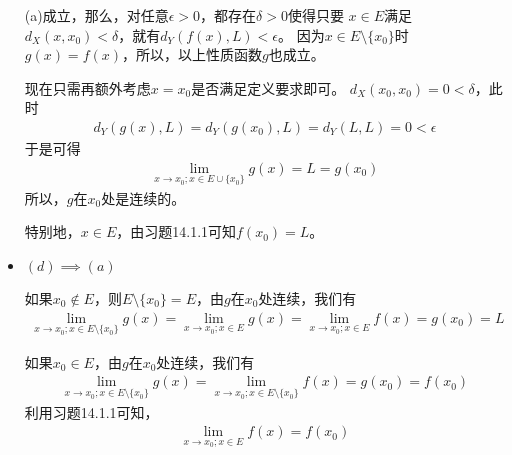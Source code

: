 \documentclass{article}
\begin{document}
\begin{itemize}
        (a)成立，那么，对任意$\epsilon > 0$，都存在$\delta > 0$使得只要
        $x \in E$满足$d_X(x, x_0) < \delta$，就有$d_Y(f(x), L) < \epsilon$。
        因为$x \in E \setminus \{x_0\}$时$g(x) = f(x)$，所以，以上性质函数$g$也成立。

        现在只需再额外考虑$x = x_0$是否满足定义要求即可。
        $d_X(x_0, x_0) = 0 < \delta$，此时
        \begin{align*}
          d_Y(g(x), L) = d_Y(g(x_0), L) = d_Y(L, L) = 0 < \epsilon
        \end{align*}
        于是可得
        \begin{align*}
          \lim\limits_{x \to x_0; x \in E \cup \{x_0\}} g(x) = L = g(x_0)
        \end{align*}
        所以，$g$在$x_0$处是连续的。

        特别地，$x \in E$，由习题14.1.1可知$f(x_0) = L$。

  \item $(d) \implies (a)$

        如果$x_0 \notin E$，则$E \setminus \{x_0\} = E$，由$g$在$x_0$处连续，我们有
        \begin{align*}
          \lim\limits_{x \to x_0; x \in E \setminus \{x_0\}} g(x) = \lim\limits_{x \to x_0; x \in E} g(x) = \lim\limits_{x \to x_0; x \in E} f(x) = g(x_0) = L
        \end{align*}

        如果$x_0 \in E$，由$g$在$x_0$处连续，我们有
        \begin{align*}
          \lim\limits_{x \to x_0; x \in E \setminus \{x_0\}} g(x) = \lim\limits_{x \to x_0; x \in E \setminus \{x_0\}} f(x) = g(x_0) = f(x_0)
        \end{align*}
        利用习题14.1.1可知，
        \begin{align*}
          \lim\limits_{x \to x_0; x \in E} f(x) = f(x_0)
        \end{align*}




\end{itemize}
\end{document}
